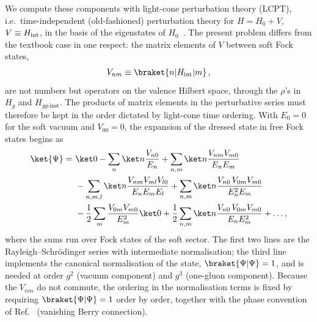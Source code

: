 We compute these components with light-cone perturbation theory (LCPT), i.e.\ time-independent
(old-fashioned) perturbation theory for $H=H_{0}+V$, $V\equiv H_{\rm int}$, in the basis of the
eigenstates of $H_{0}$~\cite{Lepage:1980fj,Brodsky:1997de}. The present problem differs from the
textbook case in one respect: the matrix elements of $V$ between soft Fock states,
\begin{align}
V_{nm}\equiv\braket{n|H_{\rm int}|m}\,,
\end{align}
are not numbers but operators on the valence Hilbert space, through the $\rho$'s in $H_{g}$ and
$H_{gg\text{-inst}}$. The products of matrix elements in the perturbative series must therefore be kept
in the order dictated by light-cone time ordering. With $E_{0}=0$ for the soft vacuum and $V_{00}=0$,
the expansion of the dressed state in free Fock states begins as
\begin{align}\label{eq:lcpt}
\ket{\Psi}=\ &\ket0-\sum_n\ket n\frac{V_{n0}}{E_n}+\sum_{n,m}\ket n\frac{V_{nm}V_{m0}}{E_nE_m}\notag\\
&-\sum_{n,m,l}\ket n\frac{V_{nm}V_{ml}V_{l0}}{E_nE_mE_l}
+\sum_{n,m}\ket n\frac{V_{n0}\,V_{0m}V_{m0}}{E_n^2E_m}\notag\\
&-\frac12\sum_m\frac{V_{0m}V_{m0}}{E_m^2}\ket0
+\frac12\sum_{n,m}\ket n\frac{V_{n0}\,V_{0m}V_{m0}}{E_nE_m^2}+\dots,
\end{align}
where the sums run over Fock states of the soft sector. The first two lines are the Rayleigh--Schr\"odinger
series with intermediate normalisation; the third line implements the canonical normalisation of the
state, $\braket{\Psi|\Psi}=1$, and is needed at order $g^{2}$ (vacuum component) and $g^{3}$ (one-gluon
component). Because the $V_{nm}$ do not commute, the ordering in the normalisation terms is fixed by
requiring $\braket{\Psi|\Psi}=1$ order by order, together with the phase convention
of Ref.~\cite{Lublinsky:2016meo} (vanishing Berry connection).
